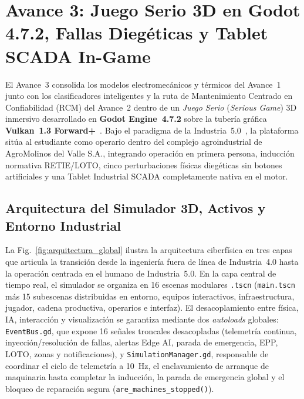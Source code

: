 \section{Avance 3: Juego Serio 3D en Godot 4.7.2, Fallas Diegéticas y Tablet SCADA In-Game}\label{sec:diseno_godot}

El Avance~3 consolida los modelos electromecánicos y térmicos del Avance~1 junto con los clasificadores inteligentes y la ruta de Mantenimiento Centrado en Confiabilidad (RCM) del Avance~2 dentro de un \emph{Juego Serio} (\textit{Serious Game}) 3D inmersivo desarrollado en \textbf{Godot Engine~4.7.2} sobre la tubería gráfica \textbf{Vulkan~1.3 Forward+}~\cite{GuiaProyecto2026,Singh2023}. Bajo el paradigma de la Industria~5.0~\cite{Breque2021,Xu2021}, la plataforma sitúa al estudiante como operario dentro del complejo agroindustrial de AgroMolinos del Valle S.A., integrando operación en primera persona, inducción normativa RETIE/LOTO, cinco perturbaciones físicas diegéticas sin botones artificiales y una Tablet Industrial SCADA completamente nativa en el motor.

\subsection{Arquitectura del Simulador 3D, Activos y Entorno Industrial}\label{subsec:arquitectura_godot}



La Fig.~\ref{fig:arquitectura_global} ilustra la arquitectura ciberfísica en tres capas que articula la transición desde la ingeniería fuera de línea de Industria~4.0 hasta la operación centrada en el humano de Industria~5.0. En la capa central de tiempo real, el simulador se organiza en \num{16} escenas modulares \texttt{.tscn} (\texttt{main.tscn} más \num{15} subescenas distribuidas en entorno, equipos interactivos, infraestructura, jugador, cadena productiva, operarios e interfaz). El desacoplamiento entre física, IA, interacción y visualización se garantiza mediante dos \emph{autoloads} globales: \texttt{EventBus.gd}, que expone \num{16} señales troncales desacopladas (telemetría continua, inyección/resolución de fallas, alertas Edge AI, parada de emergencia, EPP, LOTO, zonas y notificaciones), y \texttt{Simulation\allowbreak Manager.gd}, responsable de coordinar el ciclo de telemetría a \qty{10}{\hertz}, el enclavamiento de arranque de maquinaria hasta completar la inducción, la parada de emergencia global y el bloqueo de reparación segura (\texttt{are\_\allowbreak machines\_\allowbreak stopped()}).

